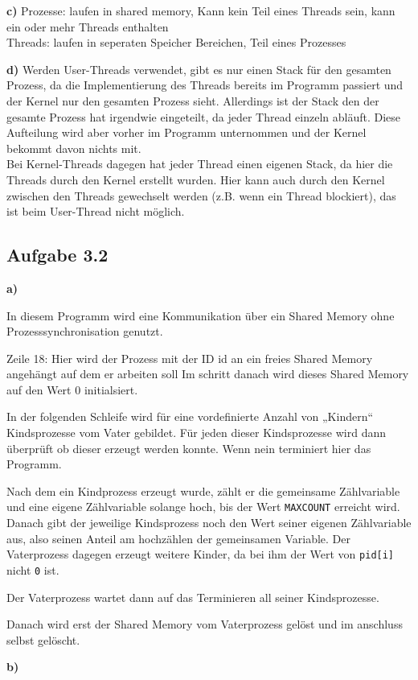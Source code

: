 \documentclass[a4paper,graphics,11pt]{article}
\newcommand{\aufgabe}[1]{\subsection*{Aufgabe #1}}
\begin{document}
\textbf{c)}
Prozesse: laufen in shared memory, Kann kein Teil eines Threads sein, kann ein oder mehr Threads enthalten\\
Threads: laufen in seperaten Speicher Bereichen, Teil eines Prozesses \\

\newpage

\textbf{d)}
Werden User-Threads verwendet, gibt es nur einen Stack für den gesamten Prozess, da die Implementierung des Threads bereits im Programm passiert und der Kernel nur den gesamten Prozess sieht. Allerdings ist der Stack den der gesamte Prozess hat irgendwie eingeteilt, da jeder Thread einzeln abläuft. Diese Aufteilung wird aber vorher im Programm unternommen und der Kernel bekommt davon nichts mit. \\
Bei Kernel-Threads dagegen hat jeder Thread einen eigenen Stack, da hier die Threads durch den Kernel erstellt wurden. Hier kann auch durch den Kernel zwischen den Threads gewechselt werden (z.B. wenn ein Thread blockiert), das ist beim User-Thread nicht möglich.

\aufgabe{3.2}

\textbf{a)}

In diesem Programm wird eine Kommunikation über ein Shared Memory ohne Prozesssynchronisation genutzt.

Zeile 18:
Hier wird der Prozess mit der ID id an ein freies Shared Memory angehängt auf dem er arbeiten soll
Im schritt danach wird dieses Shared Memory auf den Wert 0 initialsiert.

In der folgenden Schleife wird für eine vordefinierte Anzahl von „Kindern“ Kindsprozesse vom Vater gebildet.
Für jeden dieser Kindsprozesse wird dann überprüft ob dieser erzeugt werden konnte. Wenn nein terminiert hier das Programm.

Nach dem ein Kindprozess erzeugt wurde, zählt er die gemeinsame Zählvariable und eine eigene Zählvariable solange hoch, bis der Wert \texttt{MAXCOUNT} erreicht wird. Danach gibt der jeweilige Kindsprozess noch den Wert seiner eigenen Zählvariable aus, also seinen Anteil am hochzählen der gemeinsamen Variable.
Der Vaterprozess dagegen erzeugt weitere Kinder, da bei ihm der Wert von \texttt{pid[i]} nicht \texttt{0} ist.

Der Vaterprozess wartet dann auf das Terminieren all seiner Kindsprozesse.

Danach wird erst der Shared Memory vom Vaterprozess gelöst und im anschluss selbst gelöscht.


\textbf{b)}
\end{document}
